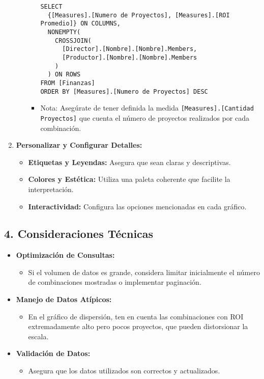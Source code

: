 \documentclass[11pt]{opticajnl}
\begin{document}
\begin{enumerate}
\begin{itemize}
\begin{itemize}
\begin{lstlisting}[style=terminal]
SELECT 
  {[Measures].[Numero de Proyectos], [Measures].[ROI Promedio]} ON COLUMNS,
  NONEMPTY(
    CROSSJOIN(
      [Director].[Nombre].[Nombre].Members,
      [Productor].[Nombre].[Nombre].Members
    )
  ) ON ROWS
FROM [Finanzas]
ORDER BY [Measures].[Numero de Proyectos] DESC
            \end{lstlisting}
            \item Nota: Asegúrate de tener definida la medida \texttt{[Measures].[Cantidad Proyectos]} que cuenta el número de proyectos realizados por cada combinación.
        \end{itemize}
    \end{itemize}
    \item \textbf{Personalizar y Configurar Detalles:}
    \begin{itemize}
        \item \textbf{Etiquetas y Leyendas:} Asegura que sean claras y descriptivas.
        \item \textbf{Colores y Estética:} Utiliza una paleta coherente que facilite la interpretación.
        \item \textbf{Interactividad:} Configura las opciones mencionadas en cada gráfico.
    \end{itemize}
\end{enumerate}

\subsection{4. Consideraciones Técnicas}

\begin{itemize}
    \item \textbf{Optimización de Consultas:}
    \begin{itemize}
        \item Si el volumen de datos es grande, considera limitar inicialmente el número de combinaciones mostradas o implementar paginación.
    \end{itemize}
    \item \textbf{Manejo de Datos Atípicos:}
    \begin{itemize}
        \item En el gráfico de dispersión, ten en cuenta las combinaciones con ROI extremadamente alto pero pocos proyectos, que pueden distorsionar la escala.
    \end{itemize}
    \item \textbf{Validación de Datos:}
    \begin{itemize}
        \item Asegura que los datos utilizados son correctos y actualizados.
    \end{itemize}
\end{itemize}
\end{document}

